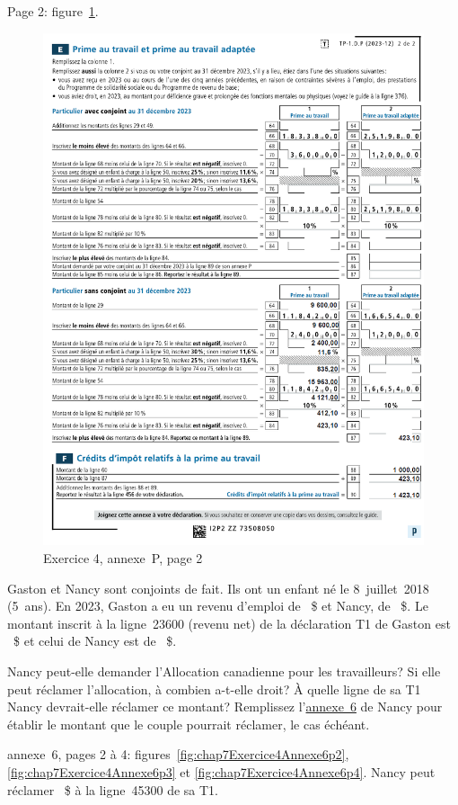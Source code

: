 Page 2: figure~\ref{fig:chap7Exercice4AnnexePp2}.
\begin{figure}
	\centering
	\includegraphics[width=.9\textwidth]{exercice/7-4/Q3/AnnexePp2.png}
	\caption[]{Exercice 4, annexe~P, page 2}
	\label{fig:chap7Exercice4AnnexePp2}
\end{figure}

\begin{question}
	Gaston et Nancy sont conjoints de fait. Ils ont un enfant né le 8~juillet~2018 (5~ans). En 2023, Gaston a eu un revenu d'emploi de ~\$ et Nancy, de ~\$. Le montant inscrit à la ligne~23600 (revenu net) de la déclaration T1 de Gaston est ~\$ et celui de Nancy est de ~\$.
	
	Nancy peut-elle demander l'Allocation canadienne pour les travailleurs? Si elle peut réclamer l'allocation, à combien a-t-elle droit? À quelle ligne de sa T1 Nancy devrait-elle réclamer ce montant? Remplissez l'\href{https://www.canada.ca/fr/agence-revenu/services/formulaires-publications/trousses-impot-toutes-annees-imposition/trousse-generale-impot-prestations/quebec/5005-s6.html}{annexe~6} de Nancy pour établir le montant que le couple pourrait réclamer, le cas échéant.
\end{question}
annexe~6, pages 2 à 4: figures~\ref{fig:chap7Exercice4Annexe6p2}, \ref{fig:chap7Exercice4Annexe6p3} et \ref{fig:chap7Exercice4Annexe6p4}. Nancy peut réclamer ~\$ à la ligne~45300 de sa T1.

